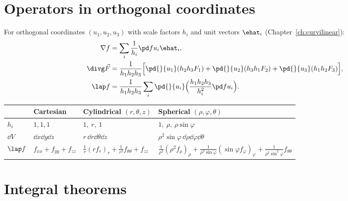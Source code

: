 \section{Operators in orthogonal coordinates}

For orthogonal coordinates $(u_1,u_2,u_3)$ with scale factors $h_i$ and unit vectors $\ehat_i$ (Chapter~\ref{ch:curvilinear}):
\begin{align*}
\nabla f&=\sum_i\frac1{h_i}\pd f{u_i}\ehat_i,\\
\divg\vec F&=\frac1{h_1h_2h_3}\Bigl[\pd{}{u_1}(h_2h_3F_1)+\pd{}{u_2}(h_3h_1F_2)+\pd{}{u_3}(h_1h_2F_3)\Bigr],\\
\lap f&=\frac1{h_1h_2h_3}\sum_i\pd{}{u_i}\Bigl(\frac{h_1h_2h_3}{h_i^2}\pd f{u_i}\Bigr).
\end{align*}

\begin{center}
\renewcommand{\arraystretch}{1.5}
\begin{tabular}{llll}
\toprule
 & \textbf{Cartesian} & \textbf{Cylindrical $(r,\theta,z)$} & \textbf{Spherical $(\rho,\varphi,\theta)$} \\
\midrule
$h_i$ & $1,1,1$ & $1,\ r,\ 1$ & $1,\ \rho,\ \rho\sin\varphi$ \\
$\dd V$ & $\dd x\dd y\dd z$ & $r\,\dd r\dd\theta\dd z$ & $\rho^2\sin\varphi\,\dd\rho\dd\varphi\dd\theta$ \\
$\lap f$ & $f_{xx}+f_{yy}+f_{zz}$ & $\frac1r(rf_r)_r+\frac1{r^2}f_{\theta\theta}+f_{zz}$ & $\frac1{\rho^2}(\rho^2f_\rho)_\rho+\frac1{\rho^2\sin\varphi}(\sin\varphi f_\varphi)_\varphi+\frac1{\rho^2\sin^2\varphi}f_{\theta\theta}$ \\
\bottomrule
\end{tabular}
\end{center}

\section{Integral theorems}

